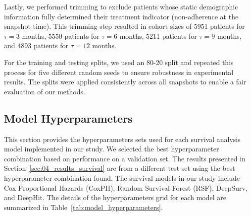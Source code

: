 Lastly, we performed trimming to exclude patients whose static demographic information fully determined their treatment indicator (non-adherence at the snapshot time).
This trimming step resulted in cohort sizes of 5951 patients for \(\tau=3\) months, 5550 patients for \(\tau=6\) months, 5211 patients for \(\tau=9\) months, and 4893 patients for \(\tau=12\) months.

For the training and testing splits, we used an 80-20 split and repeated this process for five different random seeds to ensure robustness in experimental results.
The splits were applied consistently across all snapshots to enable a fair evaluation of our methods.

\subsection{Model Hyperparameters}
\label{apd:model_hyperparams}

This section provides the hyperparameters sets used for each survival analysis model implemented in our study.
We selected the best hyperparameter combination based on performance on a validation set.
The results presented in Section~\ref{sec:04_results_survival} are from a different test set using the best hyperparameter combination found.
The survival models in our study include Cox Proportional Hazards (CoxPH), Random Survival Forest (RSF), DeepSurv, and DeepHit.
The details of the hyperparameters grid for each model are summarized in Table~\ref{tab:model_hyperparameters}.

